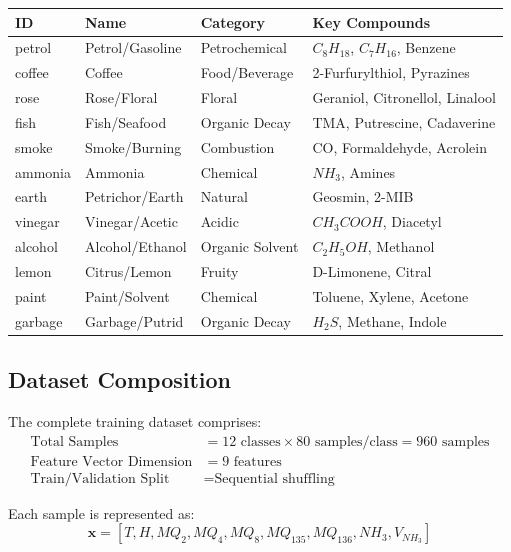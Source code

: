 \documentclass[10pt]{article}
\begin{document}
\begin{table}[ht]
\centering
\small
\begin{tabular}{|l|l|l|l|}
\hline
\textbf{ID} & \textbf{Name} & \textbf{Category} & \textbf{Key Compounds} \\
\hline
petrol & Petrol/Gasoline & Petrochemical & $C_8H_{18}$, $C_7H_{16}$, Benzene \\
coffee & Coffee & Food/Beverage & 2-Furfurylthiol, Pyrazines \\
rose & Rose/Floral & Floral & Geraniol, Citronellol, Linalool \\
fish & Fish/Seafood & Organic Decay & TMA, Putrescine, Cadaverine \\
smoke & Smoke/Burning & Combustion & CO, Formaldehyde, Acrolein \\
ammonia & Ammonia & Chemical & $NH_3$, Amines \\
earth & Petrichor/Earth & Natural & Geosmin, 2-MIB \\
vinegar & Vinegar/Acetic & Acidic & $CH_3COOH$, Diacetyl \\
alcohol & Alcohol/Ethanol & Organic Solvent & $C_2H_5OH$, Methanol \\
lemon & Citrus/Lemon & Fruity & D-Limonene, Citral \\
paint & Paint/Solvent & Chemical & Toluene, Xylene, Acetone \\
garbage & Garbage/Putrid & Organic Decay & $H_2S$, Methane, Indole \\
\hline
\end{tabular}
\end{table}

\subsection{Dataset Composition}

The complete training dataset comprises:
\begin{align}
\text{Total Samples} &= 12 \text{ classes} \times 80 \text{ samples/class} = 960 \text{ samples} \\
\text{Feature Vector Dimension} &= 9 \text{ features} \\
\text{Train/Validation Split} &= \text{Sequential shuffling}
\end{align}

Each sample is represented as:
$$\mathbf{x} = [T, H, MQ_2, MQ_4, MQ_8, MQ_{135}, MQ_{136}, NH_3, V_{NH_3}]$$
\end{document}
